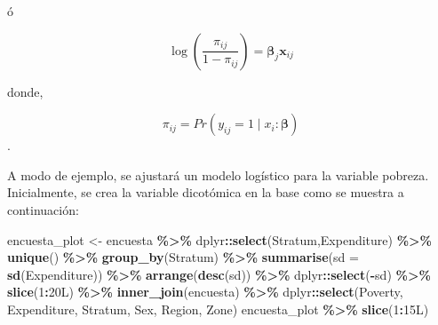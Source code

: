 \documentclass[
  12pt,
]{book}
\newenvironment{Shaded}{\begin{snugshade}}{\end{snugshade}}
\newcommand{\AttributeTok}[1]{\textcolor[rgb]{0.13,0.29,0.53}{#1}}
\newcommand{\DataTypeTok}[1]{\textcolor[rgb]{0.13,0.29,0.53}{#1}}
\newcommand{\DecValTok}[1]{\textcolor[rgb]{0.00,0.00,0.81}{#1}}
\newcommand{\FunctionTok}[1]{\textcolor[rgb]{0.13,0.29,0.53}{\textbf{#1}}}
\newcommand{\NormalTok}[1]{#1}
\newcommand{\OtherTok}[1]{\textcolor[rgb]{0.56,0.35,0.01}{#1}}
\newcommand{\SpecialCharTok}[1]{\textcolor[rgb]{0.81,0.36,0.00}{\textbf{#1}}}
\begin{document}
ó

\[
\log\left(\frac{\pi_{ij}}{1-\pi_{ij}}\right)=\boldsymbol{\beta}_{j}\boldsymbol{x}_{ij}
\]

donde,

\[
\pi_{ij}=Pr\left(y_{ij}=1\mid x_{i}:\boldsymbol{\beta}\right)
\].

A modo de ejemplo, se ajustará un modelo logístico para la variable pobreza. Inicialmente, se crea la variable dicotómica en la base como se muestra a continuación:

\begin{Shaded}
\begin{Highlighting}[]
\NormalTok{encuesta\_plot }\OtherTok{\textless{}{-}}\NormalTok{ encuesta }\SpecialCharTok{\%\textgreater{}\%}
\NormalTok{  dplyr}\SpecialCharTok{::}\FunctionTok{select}\NormalTok{(Stratum,Expenditure) }\SpecialCharTok{\%\textgreater{}\%} \FunctionTok{unique}\NormalTok{() }\SpecialCharTok{\%\textgreater{}\%}
  \FunctionTok{group\_by}\NormalTok{(Stratum)  }\SpecialCharTok{\%\textgreater{}\%} 
  \FunctionTok{summarise}\NormalTok{(}\AttributeTok{sd =} \FunctionTok{sd}\NormalTok{(Expenditure)) }\SpecialCharTok{\%\textgreater{}\%} 
  \FunctionTok{arrange}\NormalTok{(}\FunctionTok{desc}\NormalTok{(sd)) }\SpecialCharTok{\%\textgreater{}\%}\NormalTok{ dplyr}\SpecialCharTok{::}\FunctionTok{select}\NormalTok{(}\SpecialCharTok{{-}}\NormalTok{sd) }\SpecialCharTok{\%\textgreater{}\%} 
  \FunctionTok{slice}\NormalTok{(}\DecValTok{1}\SpecialCharTok{:}\DecValTok{20}\DataTypeTok{L}\NormalTok{) }\SpecialCharTok{\%\textgreater{}\%}
  \FunctionTok{inner\_join}\NormalTok{(encuesta) }\SpecialCharTok{\%\textgreater{}\%}  
\NormalTok{  dplyr}\SpecialCharTok{::}\FunctionTok{select}\NormalTok{(Poverty, Expenditure, Stratum, }
\NormalTok{         Sex, Region, Zone) }
\NormalTok{encuesta\_plot }\SpecialCharTok{\%\textgreater{}\%} \FunctionTok{slice}\NormalTok{(}\DecValTok{1}\SpecialCharTok{:}\DecValTok{15}\DataTypeTok{L}\NormalTok{)}
\end{Highlighting}
\end{Shaded}
\end{document}

